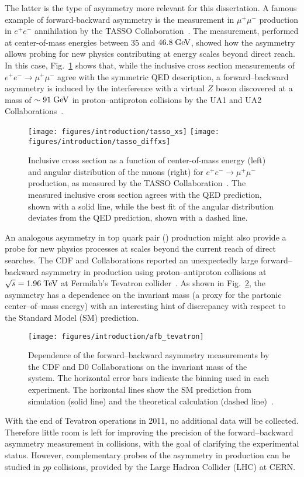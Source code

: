 The latter is the type of asymmetry more relevant for this
dissertation. A famous example of forward-backward asymmetry is the
measurement in $\mu^+\mu^-$ production in $e^+e^-$ annihilation by the
TASSO Collaboration~\cite{Braunschweig:1988fy}. The measurement,
performed at center-of-mass energies between $35$ and $46.8\; \mathrm{GeV}{}$,
showed how the asymmetry allows probing for new physics contributing at
energy scales beyond direct reach. In this case, Fig.~\ref{fig:tasso}
shows that, while the inclusive cross section measurements of
$e^+e^-\to\mu^+\mu^-$ agree with the symmetric QED description, a
forward--backward asymmetry is induced by the interference with a
virtual $Z$ boson discovered at a mass of $\sim 91\; \mathrm{GeV}{}$ in
proton--antiproton collisions by the UA1 and UA2
Collaborations~\cite{Arnison:1983rp,Banner:1983jy}. 

\begin{figure}[!htb]\centering
  \texttt{[image: figures/introduction/tasso\_xs]}
  \texttt{[image: figures/introduction/tasso\_diffxs]}
  \caption{Inclusive cross section as a function of center-of-mass
    energy (left) and angular distribution of the muons (right) for
    $e^+e^-\to\mu^+\mu^-$ production, as measured by the TASSO
    Collaboration~\cite{Braunschweig:1988fy}. The measured inclusive cross
    section agrees with the QED prediction, shown with a solid line,
    while the best fit of the angular distribution deviates from the
    QED prediction, shown with a dashed line.} 
  \label{fig:tasso}
\end{figure}

An analogous asymmetry in top quark pair (\ttbar{}) production might also provide a
probe for new physics processes at scales beyond the current reach of direct
searches. The CDF and \dzero{} Collaborations reported an unexpectedly
large forward--backward asymmetry in \ttbar{} production using
proton--antiproton collisions at $\sqrt{s}=1.96\; \mathrm{TeV}{}$ at Fermilab's
Tevatron collider~\cite{Abazov:2014cca,Aaltonen:2012it}. As shown in
Fig.~\ref{fig:afbtev}, the asymmetry has a dependence on the \ttbar{}
invariant mass (a proxy for the partonic center--of--mass energy) with
an interesting hint of discrepancy with respect to the Standard Model (SM)
prediction.
\begin{figure}[!htb]\centering
  \texttt{[image: figures/introduction/afb\_tevatron]}
  \caption{Dependence of the forward--backward asymmetry measurements
    by the CDF and D0 Collaborations on the invariant mass of the
    \ttbar{} system. The horizontal error bars indicate the binning
    used in each experiment. The horizontal lines show the SM
    prediction from simulation (solid line) and the theoretical
    calculation (dashed line)~\cite{Bernreuther:2012sx}.}
  \label{fig:afbtev}
\end{figure}
With the end of Tevatron operations in 2011, no additional data will
be collected. Therefore little room is left for improving the
precision of the forward--backward asymmetry measurement in \ppbar{}
collisions, with the goal of clarifying the experimental status.
However, complementary probes of the asymmetry in \ttbar{} production
can be studied in $pp$ collisions, provided by the Large Hadron
Collider (LHC) at CERN.

